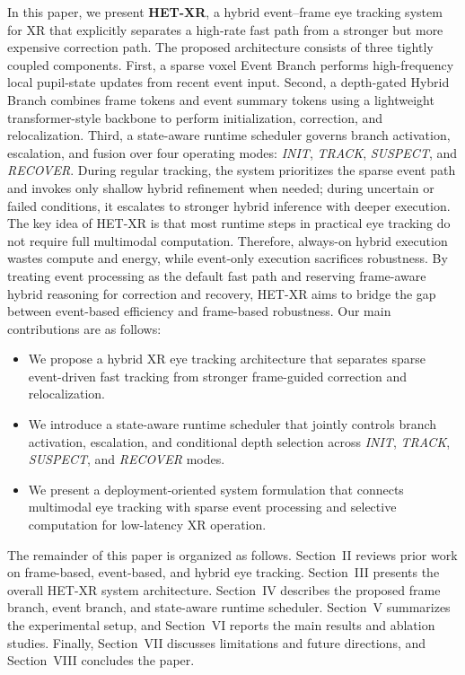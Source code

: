 \documentclass[journal]{IEEEtran}
\begin{document}
%
In this paper, we present \textbf{HET-XR}, a hybrid event--frame eye tracking system for XR that explicitly separates a high-rate fast path from a stronger but more expensive correction path. The proposed architecture consists of three tightly coupled components. First, a sparse voxel Event Branch performs high-frequency local pupil-state updates from recent event input. Second, a depth-gated Hybrid Branch combines frame tokens and event summary tokens using a lightweight transformer-style backbone to perform initialization, correction, and relocalization. Third, a state-aware runtime scheduler governs branch activation, escalation, and fusion over four operating modes: \textit{INIT}, \textit{TRACK}, \textit{SUSPECT}, and \textit{RECOVER}. During regular tracking, the system prioritizes the sparse event path and invokes only shallow hybrid refinement when needed; during uncertain or failed conditions, it escalates to stronger hybrid inference with deeper execution.
%
The key idea of HET-XR is that most runtime steps in practical eye tracking do not require full multimodal computation. Therefore, always-on hybrid execution wastes compute and energy, while event-only execution sacrifices robustness. By treating event processing as the default fast path and reserving frame-aware hybrid reasoning for correction and recovery, HET-XR aims to bridge the gap between event-based efficiency and frame-based robustness. Our main contributions are as follows:
\begin{itemize}
    \item We propose a hybrid XR eye tracking architecture that separates sparse event-driven fast tracking from stronger frame-guided correction and relocalization.
    \item We introduce a state-aware runtime scheduler that jointly controls branch activation, escalation, and conditional depth selection across \textit{INIT}, \textit{TRACK}, \textit{SUSPECT}, and \textit{RECOVER} modes.
    \item We present a deployment-oriented system formulation that connects multimodal eye tracking with sparse event processing and selective computation for low-latency XR operation.
\end{itemize}
%
The remainder of this paper is organized as follows. Section~II reviews prior work on frame-based, event-based, and hybrid eye tracking. Section~III presents the overall HET-XR system architecture. Section~IV describes the proposed frame branch, event branch, and state-aware runtime scheduler. Section~V summarizes the experimental setup, and Section~VI reports the main results and ablation studies. Finally, Section~VII discusses limitations and future directions, and Section~VIII concludes the paper.
%
\end{document}
